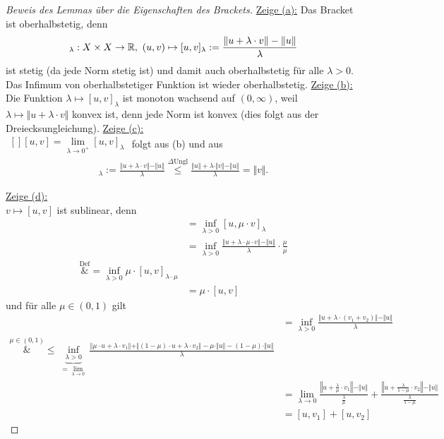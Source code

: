 \begin{proof}[Beweis des Lemmas über die Eigenschaften des Brackets]\enter
\underline{Zeige (a):} Das Bracket ist oberhalbstetig, denn
\begin{align*}
[\cdot,\cdot]_\lambda:X\times X\to\R,~(u,v)\mapsto[u,v]_\lambda:=\frac{\Vert u+\lambda\cdot v\Vert - \Vert u\Vert}{\lambda}
\end{align*}
ist stetig (da jede Norm stetig ist) und damit auch oberhalbstetig für alle $\lambda>0$. Das Infimum von oberhalbstetiger Funktion ist wieder oberhalbstetig.\nl
\underline{Zeige (b):}\\
Die Funktion $\lambda\mapsto[u,v]_\lambda$ ist monoton wachsend auf $(0,\infty)$, weil $\lambda\mapsto\Vert u+\lambda\cdot v\Vert$ konvex ist, denn jede Norm ist konvex (dies folgt aus der Dreiecksungleichung).\nl
\underline{Zeige (c):}\\
$\begin{aligned}[]
[u,v]=\lim\limits_{\lambda\to0^+}[u,v]_\lambda
\end{aligned}$ folgt aus (b) und aus
\begin{align*}
[u,v]_\lambda:=\frac{\Vert u+\lambda\cdot v\Vert-\Vert u\Vert}{\lambda}
\stackrel{\Delta\text{Ungl}}{\leq}
\frac{\Vert u\Vert+\lambda\cdot\Vert v\Vert-\Vert u\Vert}{\lambda}
=\Vert v\Vert.
\end{align*}

\underline{Zeige (d):}\\
$v\mapsto[u,v]$ ist sublinear, denn
\begin{align*}
[u,\mu\cdot v]
&=
\inf\limits_{\lambda>0}[u,\mu\cdot v]_\lambda\\
&=\inf\limits_{\lambda>0}\frac{\Vert u+\lambda\cdot\mu\cdot v\Vert-\Vert u\Vert}{\lambda}\cdot\frac{\mu}{\mu}\\
\overset{\text{Def}}&=
\inf\limits_{\lambda>0}\mu\cdot[u,v]_{\lambda\cdot\mu}\\
&=\mu\cdot[u,v]
\end{align*}
und für alle $\mu\in(0,1)$ gilt
\begin{align*}
[u,v_1+v_2]
&=
\inf\limits_{\lambda>0}\frac{\Vert u+\lambda\cdot(v_1+v_2)\Vert-\Vert u\Vert}{\lambda}\\
\overset{\mu\in(0,1)}&{\leq}
\underbrace{\inf\limits_{\lambda>0}}_{=\lim\limits_{\lambda\to0}}
\frac{\Vert\mu\cdot u+\lambda\cdot v_1\Vert+\Vert(1-\mu)\cdot u+\lambda\cdot v_2\Vert-\mu\cdot\Vert u\Vert-(1-\mu)\cdot\Vert u\Vert}{\lambda}\\
&=\lim\limits_{\lambda\to0}\frac{\left\Vert u+\frac{\lambda}{\mu}\cdot v_1\right\Vert-\Vert u\Vert}{\frac{\lambda}{\mu}}+\frac{\left\Vert u+\frac{\lambda}{1-\mu}\cdot v_2\right\Vert-\Vert u\Vert}{\frac{\lambda}{1-\mu}}\\
&=[u,v_1]+[u,v_2]
\end{align*}


\end{proof}
